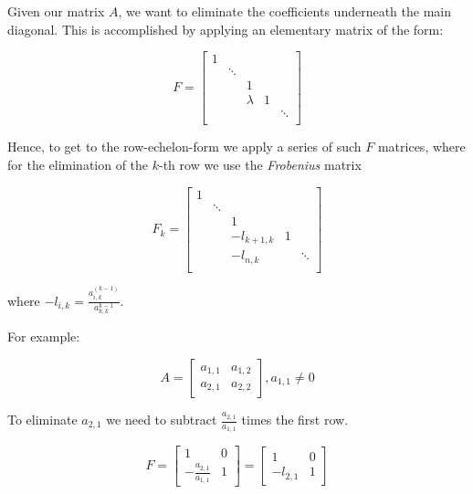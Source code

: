 Given our matrix \(A\), we want to eliminate the coefficients underneath the main diagonal. This is accomplished by applying an elementary matrix of the form: 

\[
    F = 
    \begin{bmatrix}
        1 &        &         &   &        \\
          & \ddots &         &   &        \\
          &        & 1       &   &        \\
          &        & \lambda & 1 &        \\
          &        &         &   & \ddots \\
    \end{bmatrix}
\]

Hence, to get to the row-echelon-form we apply a series of such \(F\) matrices, where for the 
elimination of the \(k\)-th row we use the \emph{Frobenius} matrix 

\[
    F_k = 
    \begin{bmatrix}
        1 &        &         &   &        \\
          & \ddots &         &   &        \\
          &        & 1       &   &        \\
          &        & -l_{k +1, k} & 1 &        \\
          &        &  -l_{n,k}       &   & \ddots \\
    \end{bmatrix}
\]

where \(-l_{i,k} = \frac{a_{i,k}^{(k - 1)}}{a_{k,k}^{k - 1}}\). 

For example: 

\[
    A = 
    \begin{bmatrix}
        a_{1,1} & a_{1,2} \\ 
        a_{2,1} & a_{2,2}
    \end{bmatrix}
    ,
    a_{1,1} \ne 0
\]

To eliminate \(a_{2,1}\) we need to subtract \(\frac{a_{2,1}}{a_{1,1}}\) times the first row.

\[
    F = 
    \begin{bmatrix}
        1 & 0 \\ 
       - \frac{a_{2,1}}{a_{1,1}} & 1
    \end{bmatrix}
    = 
    \begin{bmatrix}
        1 & 0 \\ 
        - l_{2,1} & 1
    \end{bmatrix}
\]

